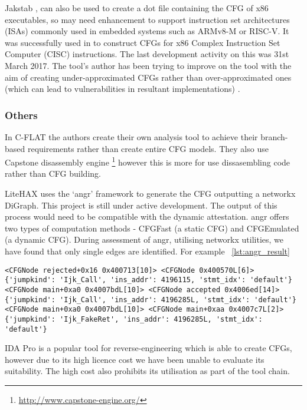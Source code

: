 Jakstab \cite{Kinder2008},\cite{Kinder2010} can also be used to create a dot file containing the CFG of x86 executables, so may need enhancement to support instruction set architectures (ISAs) commonly used in embedded systems such as ARMv8-M or RISC-V. It was successfully used in \cite{Nguyen2013} to construct CFGs for x86 Complex Instruction Set Computer (CISC) instructions. The last development activity on this was 31st March 2017. The tool's author has been trying to improve on the tool with the aim of creating under-approximated CFGs rather than over-approximated ones (which can lead to vulnerabilities in resultant implementations) \cite{Kinder2012}.

\subsubsection*{Others}

In C-FLAT \cite{Abera2016} the authors create their own analysis tool to achieve their branch-based requirements rather than create entire CFG models. They also use Capstone disassembly engine \footnote{\url{http://www.capstone-engine.org/}} however this is more for use dissasembling code rather than CFG building.

LiteHAX \cite{Dessouky2018} uses the `angr' \cite{Shoshitaishvili2016} framework to generate the CFG outputting a networkx \cite{Hagberg2008} DiGraph. This project is still under active development. The output of this process would need to be compatible with the dynamic attestation. angr offers two types of computation methods - CFGFast (a static CFG) and CFGEmulated (a dynamic CFG).
During assessment of angr, utilising networkx utilities, we have found that only single edges are identified. For example ~\ref{lst:angr_result}

\begin{lstlisting}[caption={Example of results from angr CFG analysis of fauxware in form of .edgelist output from networkx utilities},label={lst:angr_result}]
<CFGNode rejected+0x16 0x400713[10]> <CFGNode 0x400570L[6]> {'jumpkind': 'Ijk_Call', 'ins_addr': 4196115, 'stmt_idx': 'default'}
<CFGNode main+0xa0 0x4007bdL[10]> <CFGNode accepted 0x4006ed[14]> {'jumpkind': 'Ijk_Call', 'ins_addr': 4196285L, 'stmt_idx': 'default'}
<CFGNode main+0xa0 0x4007bdL[10]> <CFGNode main+0xaa 0x4007c7L[2]> {'jumpkind': 'Ijk_FakeRet', 'ins_addr': 4196285L, 'stmt_idx': 'default'}
\end{lstlisting}

IDA Pro is a popular tool for reverse-engineering which is able to create CFGs, however due to its high licence cost we have been unable to evaluate its suitability. The high cost also prohibits its utilisation as part of the tool chain.

